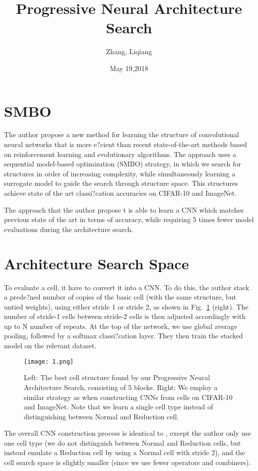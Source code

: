 \documentclass{article}
\author{Zhang, Liqiang}
\date{May 19,2018}
\title{Progressive Neural Architecture Search}
\begin{document}
\maketitle
\par
\section{SMBO}
The author propose a new method for learning the structure of convolutional neural networks that is more e?cient than recent state-of-the-art methods based on reinforcement learning and evolutionary algorithms. The approach uses a sequential model-based optimization (SMBO) strategy, in which we search for structures in order of increasing complexity\cite{Krizhevsky2009Learning}, while simultaneously learning a surrogate model to guide the search through structure space. This structures achieve state of the art classi?cation accuracies on CIFAR-10 and ImageNet.
\par
The approach that the author propose t is able to learn a CNN which matches previous state of the art in terms of accuracy, while requiring 5 times fewer model evaluations during the architecture search. 
\section{Architecture Search Space}
To evaluate a cell, it have to convert it into a CNN. To do this, the author stack a prede?ned number of copies of the basic cell (with the same structure, but untied weights), using either stride 1 or stride 2, as shown in Fig.~\ref{1} (right). The number of stride-1 cells between stride-2 cells is then adjusted accordingly with up to N number of repeats. At the top of the network, we use global average pooling, followed by a softmax classi?cation layer. They then train the stacked model on the relevant dataset.
\begin{figure}[H]
  \centering
  \texttt{[image: 1.png]}\\
  \caption{ Left: The best cell structure found by our Progressive Neural Architecture Search, consisting of 5 blocks. Right: We employ a similar strategy as \cite{Stanley2014Evolving} when constructing CNNs from cells on CIFAR-10 and ImageNet. Note that we learn a single cell type instead of distinguishing between Normal and Reduction cell.}\label{1}
\end{figure}
The overall CNN construction process is identical to \cite{Williams1992Simple}, except the author only use one cell type (we do not distinguish between Normal and Reduction cells, but instead emulate a Reduction cell by using a Normal cell with stride 2), and the cell search space is slightly smaller (since we use fewer operators and combiners).
\newpage
\end{document}
